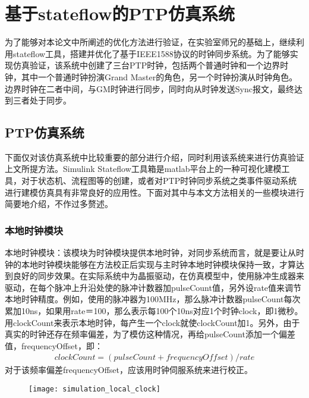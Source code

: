 \section{基于stateflow的PTP仿真系统}
为了能够对本论文中所阐述的优化方法进行验证，在实验室师兄的基础上，继续利用stateflow工具，搭建并优化了基于IEEE1588协议的时钟同步系统。为了能够实现仿真验证，该系统中创建了三台PTP时钟，包括两个普通时钟和一个边界时钟，其中一个普通时钟扮演Grand Master的角色，另一个时钟扮演从时钟角色。边界时钟在二者中间，与GM时钟进行同步，同时向从时钟发送Sync报文，最终达到三者处于同步。

\subsection{PTP仿真系统}
下面仅对该仿真系统中比较重要的部分进行介绍，同时利用该系统来进行仿真验证上文所提方法。Simulink Stateflow工具箱是matlab平台上的一种可视化建模工具，对于状态机、流程图等的创建，或者对PTP时钟同步系统之类事件驱动系统进行建模仿真具有非常良好的应用性。下面对其中与本文方法相关的一些模块进行简要地介绍，不作过多赘述。

\subsubsection{本地时钟模块}
本地时钟模块：该模块为时钟模块提供本地时钟，对同步系统而言，就是要让从时钟的本地时钟模块能够在方法校正后实现与主时钟本地时钟模块保持一致，才算达到良好的同步效果。在实际系统中为晶振驱动，在仿真模型中，使用脉冲生成器来驱动，在每个脉冲上升沿处使的脉冲计数器加pulseCount值，另外设rate值来调节本地时钟精度。例如，使用的脉冲器为100MHz，那么脉冲计数器pulseCount每次累加10ns，如果用rate＝100，那么表示每100个10ns对应1个时钟clock，即1微秒。用clockCount来表示本地时钟，每产生一个clock就使clockCount加1。另外，由于真实的时钟还存在频率偏差，为了模仿这种情况，再给pulseCount添加一个偏差值，frequencyOffset，即：
\begin{align}
  clockCount = (pulseCount + frequencyOffset) / rate
\end{align}
对于该频率偏差frequencyOffset，应该用时钟伺服系统来进行校正。
\begin{figure}[!hbp]
  \centering
  \begin{minipage}[b]{1\textwidth}
    \captionstyle{\centering}
    \centering
    \texttt{[image: simulation\_local\_clock]}
  \end{minipage}     
\end{figure}

